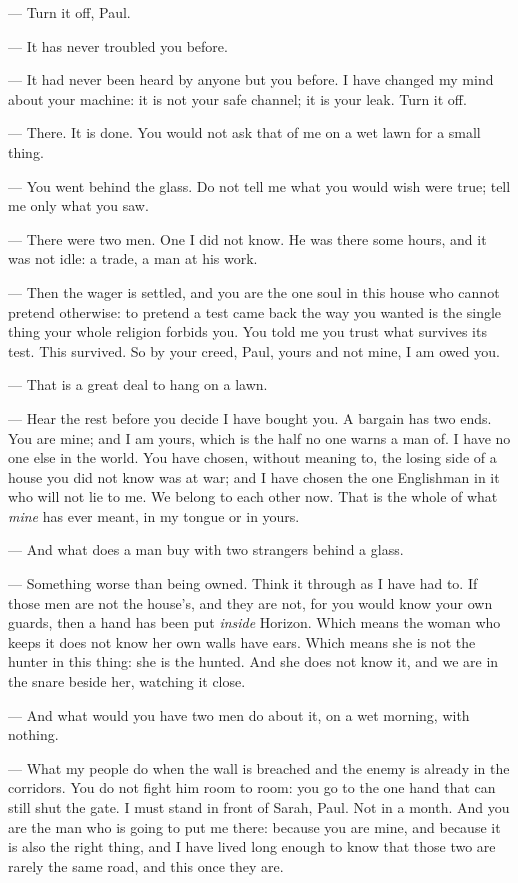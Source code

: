 \ornament

\begin{room}

--- Turn it off, Paul.

--- It has never troubled you before.

--- It had never been heard by anyone but you before. I have changed my mind about your machine: it is not your safe channel; it is your leak. Turn it off.

--- There. It is done. You would not ask that of me on a wet lawn for a small thing.

--- You went behind the glass. Do not tell me what you would wish were true; tell me only what you saw.

--- There were two men. One I did not know. He was there some hours, and it was not idle: a trade, a man at his work.

--- Then the wager is settled, and you are the one soul in this house who cannot pretend otherwise: to pretend a test came back the way you wanted is the single thing your whole religion forbids you. You told me you trust what survives its test. This survived. So by your creed, Paul, yours and not mine, I am owed you.

--- That is a great deal to hang on a lawn.

--- Hear the rest before you decide I have bought you. A bargain has two ends. You are mine; and I am yours, which is the half no one warns a man of. I have no one else in the world. You have chosen, without meaning to, the losing side of a house you did not know was at war; and I have chosen the one Englishman in it who will not lie to me. We belong to each other now. That is the whole of what \textit{mine} has ever meant, in my tongue or in yours.

--- And what does a man buy with two strangers behind a glass.

--- Something worse than being owned. Think it through as I have had to. If those men are not the house's, and they are not, for you would know your own guards, then a hand has been put \textit{inside} Horizon. Which means the woman who keeps it does not know her own walls have ears. Which means she is not the hunter in this thing: she is the hunted. And she does not know it, and we are in the snare beside her, watching it close.

--- And what would you have two men do about it, on a wet morning, with nothing.

--- What my people do when the wall is breached and the enemy is already in the corridors. You do not fight him room to room: you go to the one hand that can still shut the gate. I must stand in front of Sarah, Paul. Not in a month. And you are the man who is going to put me there: because you are mine, and because it is also the right thing, and I have lived long enough to know that those two are rarely the same road, and this once they are.


\end{room}
